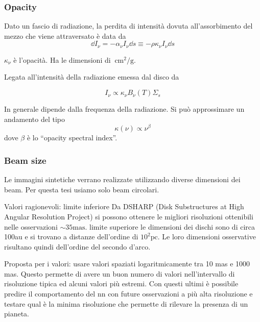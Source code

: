 \documentclass[DIN, pagenumber=false, fontsize=11pt, parskip=half]{scrartcl}
\begin{document}
\subsubsection{Opacity}
\label{opa}

Dato un fascio di radiazione, la perdita di intensità dovuta all'assorbimento del mezzo che viene attraversato è data da
\begin{equation}
 \dd I_\nu = - \alpha_\nu I_\nu \dd s \equiv - \rho \kappa_\nu I_\nu \dd s
\end{equation}


$\kappa_\nu$ è l'opacità. Ha le dimensioni di $\SI{}{\cm\squared\per\g}$.

Legata all'intensità della radiazione emessa dal disco da 

\begin{equation}
 I_\nu \propto \kappa_\nu B_\nu (T ) \Sigma_s
\end{equation}

In generale dipende dalla frequenza della radiazione. Si può approssimare un andamento del tipo 
\begin{equation}
 \kappa(\nu) \propto \nu^\beta
\end{equation}
dove $\beta$ è lo ``opacity spectral index''.

\subsubsection{Beam size}
\label{bs}

Le immagini sintetiche verrano realizzate utilizzando diverse dimensioni dei beam. Per questa tesi usiamo solo beam circolari. 

Valori ragionevoli:
limite inferiore \- Da DSHARP (Disk Substructures at High Angular Resolution Project) si possono ottenere le migliori risoluzioni ottenibili nelle osservazioni $\sim 35 \text{mas}$. 
limite superiore \- le dimensioni dei dischi sono di circa 100au e si trovano a distanze dell'ordine di $10^2 \text{pc}$. Le loro dimensioni osservative risultano quindi dell'ordine del secondo d'arco.

Proposta per i valori: usare valori spaziati logaritmicamente tra 10 mas e 1000 mas. Questo permette di avere un buon numero di valori nell'intervallo di risoluzione tipica ed alcuni valori più estremi. Con questi ultimi è possibile predire il comportamento del nn con future osservazioni a più alta risoluzione e testare qual è la minima risoluzione che permette di rilevare la presenza di un pianeta.
\end{document}
